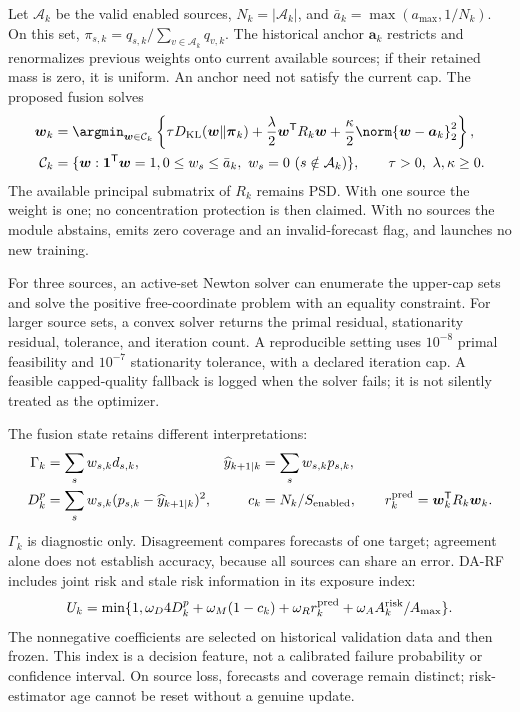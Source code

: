 Let $\mathcal A_k$ be the valid enabled sources, $N_k=|\mathcal A_k|$, and
$\bar a_k=\max(a_{\max},1/N_k)$. On this set,
$\pi_{s,k}=q_{s,k}/\sum_{v\in\mathcal A_k}q_{v,k}$.
The historical anchor $\boldsymbol a_k$ restricts and renormalizes previous
weights onto current available sources; if their retained mass is zero, it is
uniform. An anchor need not satisfy the current cap. The proposed fusion solves
\begin{align}
 \boldsymbol w_k&=\argmin_{\boldsymbol w\in\mathcal C_k}
 \left\{\tau D_{\rm KL}(\boldsymbol w\Vert\boldsymbol\pi_k)
       +\frac\lambda2\boldsymbol w^{\mathsf T}R_k\boldsymbol w
       +\frac\kappa2\norm{\boldsymbol w-\boldsymbol a_k}_2^2\right\},
 \label{eq:main-fusion}\\
 \mathcal C_k&=\{\boldsymbol w:\boldsymbol1^{\mathsf T}\boldsymbol w=1,
   0\le w_s\le\bar a_k,\ w_s=0\ (s\notin\mathcal A_k)\},
 \qquad \tau>0,\ \lambda,\kappa\ge0.
\end{align}
The available principal submatrix of $R_k$ remains PSD. With one source the
weight is one; no concentration protection is then claimed. With no sources
the module abstains, emits zero coverage and an invalid-forecast flag, and
launches no new training.

For three sources, an active-set Newton solver can enumerate the upper-cap
sets and solve the positive free-coordinate problem with an equality constraint.
For larger source sets, a convex solver returns the primal residual,
stationarity residual, tolerance, and iteration count. A reproducible setting
uses $10^{-8}$ primal feasibility and $10^{-7}$ stationarity tolerance, with
a declared iteration cap. A feasible capped-quality fallback is logged when
the solver fails; it is not silently treated as the optimizer.

The fusion state retains different interpretations:
\begin{align}
 \Gamma_k&=\sum_s w_{s,k}d_{s,k},&
 \widehat y_{k+1|k}&=\sum_s w_{s,k}p_{s,k},\\
 D_k^p&=\sum_s w_{s,k}(p_{s,k}-\widehat y_{k+1|k})^2,&
 c_k&=N_k/S_{\rm enabled},\qquad
 r_k^{\rm pred}=\boldsymbol w_k^{\mathsf T}R_k\boldsymbol w_k.
 \label{eq:fusion-state}
\end{align}
$\Gamma_k$ is diagnostic only. Disagreement compares forecasts of one target;
agreement alone does not establish accuracy, because all sources can share an
error. DA-RF includes joint risk and stale risk information in its exposure index:
\begin{equation}
 U_k=\min\{1,\omega_D4D_k^p+\omega_M(1-c_k)
           +\omega_R r_k^{\rm pred}+\omega_A A_k^{\rm risk}/A_{\max}\}.
 \label{eq:decision-uncertainty}
\end{equation}
The nonnegative coefficients are selected on historical validation data and
then frozen. This index is a decision feature, not a calibrated failure
probability or confidence interval. On source loss, forecasts and coverage
remain distinct; risk-estimator age cannot be reset without a genuine update.

